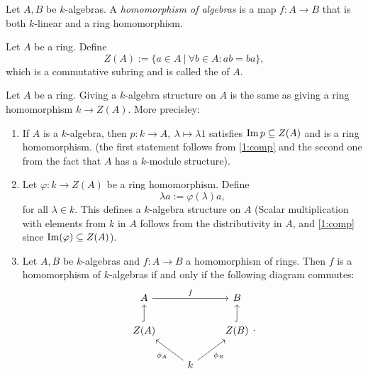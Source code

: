 \begin{defn}
	Let $A,B$ be $k$-algebras. A \emph{homomorphism of algebras} is a map $f:A\to B$ that is both $k$-linear and a ring homomorphism.
\end{defn}
\begin{rem}
	Let $A$ be a ring. Define
	\[
		Z(A):= \{a\in A~|~\forall b\in A: ab=ba\},
	\]
	which is a commutative subring and is called the  of $A$.
\end{rem}
\begin{rem}
	Let $A$ be a ring. Giving a $k$-algebra structure on $A$ is the same as giving a ring homomorphism $k\to Z(A)$. More precisley:
	\begin{enumerate}
		\item If $A$ is a $k$-algebra, then $p:k\to A,~\lambda\mapsto \lambda 1$ satisfies $\operatorname{Im} p\subseteq Z(A)$ and is a ring homomorphism. (the first statement follows from \eqref{1:comp} and the second one from the fact that $A$ has a $k$-module structure).
		 \item Let $\varphi:k\to Z(A)$ be a ring homomorphism. Define
		 \[
		 \lambda a:= \varphi(\lambda)a,
			\]
		for all $\lambda \in k$. This defines a $k$-algebra structure on $A$ (Scalar multiplication with elements from $k$ in $A$ follows from the distributivity in $A$, and \eqref{1:comp} since $\operatorname{Im}(\varphi)\subseteq Z(A)$).
		\item Let $A,B$ be $k$-algebras and $f:A\to B$ a homomorphism of rings. Then $f$ is a homomorphism of $k$-algebras if and only if the following diagram commutes:
		\[
		\begin{tikzcd}
			A\ar{rr}{f}&&B\\
			Z(A)\ar[hookrightarrow]{u}&&\ar[hookrightarrow]{u}Z(B)\\
			&k\ar{ul}{\phi_A}\ar[swap]{ur}{\phi_B}&
		\end{tikzcd}.
		\]
	\end{enumerate}
\end{rem}
